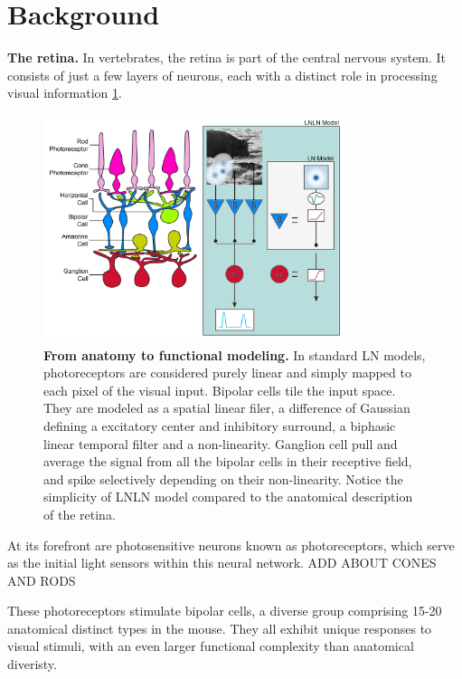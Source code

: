 \section{Background}\label{sec:background}

\textbf{The retina.}
In vertebrates, the retina is part of the central nervous system. It consists
of just a few layers of neurons, each with a distinct role in processing visual
information \ref{fig:retina_structure}.

\begin{figure}[h]
    \centering
    \includegraphics[width=0.8\textwidth]{pics/RetinaAnatToFunction.png}
    \caption{\textbf{From anatomy to functional modeling.} In standard LN
        models,
        photoreceptors are considered purely linear and simply mapped to each
        pixel of
        the visual input. Bipolar cells tile the input space. They are modeled
        as a
        spatial linear filer, a difference of Gaussian defining a excitatory
        center and
        inhibitory surround, a biphasic linear temporal filter and a
        non-linearity.
        Ganglion cell pull and average the signal from all the bipolar cells in
        their
        receptive field, and spike selectively depending on their
        non-linearity. Notice the simplicity of LNLN model compared to the
        anatomical
        description of the retina.}
    \label{fig:retina_structure}
\end{figure}

At its forefront are photosensitive neurons known as photoreceptors, which
serve as the initial light sensors within this neural network. ADD ABOUT CONES
AND RODS

These photoreceptors stimulate bipolar cells, a diverse group comprising 15-20
anatomical
distinct types in the mouse. They all exhibit unique
responses to visual stimuli, with an even larger functional complexity than
anatomical diveristy. %

